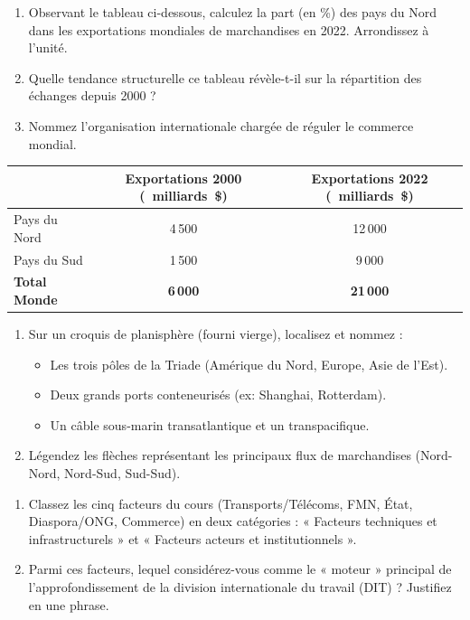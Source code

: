 \documentclass[11pt]{article}
\begin{document}
\begin{exercice}
\begin{enumerate}
    \item Observant le tableau ci-dessous, calculez la part (en \%) des pays du Nord dans les exportations mondiales de marchandises en 2022. Arrondissez à l'unité.
    \item Quelle tendance structurelle ce tableau révèle-t-il sur la répartition des échanges depuis 2000 ?
    \item Nommez l'organisation internationale chargée de réguler le commerce mondial.
\end{enumerate}

\begin{tabular}{lcc}
\hline
 & \textbf{Exportations 2000 (\SI{}{milliards \$})} & \textbf{Exportations 2022 (\SI{}{milliards \$})} \\
\hline
Pays du Nord & 4\,500 & 12\,000 \\
Pays du Sud & 1\,500 & 9\,000 \\
\hline
\textbf{Total Monde} & \textbf{6\,000} & \textbf{21\,000} \\
\hline
\end{tabular}
\end{exercice}

\begin{exercice}
\begin{enumerate}
    \item Sur un croquis de planisphère (fourni vierge), localisez et nommez : 
    \begin{itemize}
        \item Les trois pôles de la Triade (Amérique du Nord, Europe, Asie de l'Est).
        \item Deux grands ports conteneurisés (ex: Shanghai, Rotterdam).
        \item Un câble sous-marin transatlantique et un transpacifique.
    \end{itemize}
    \item Légendez les flèches représentant les principaux flux de marchandises (Nord-Nord, Nord-Sud, Sud-Sud).
\end{enumerate}
\end{exercice}

\begin{exercice}
\begin{enumerate}
    \item Classez les cinq facteurs du cours (Transports/Télécoms, FMN, État, Diaspora/ONG, Commerce) en deux catégories : « Facteurs techniques et infrastructurels » et « Facteurs acteurs et institutionnels ».
    \item Parmi ces facteurs, lequel considérez-vous comme le « moteur » principal de l'approfondissement de la division internationale du travail (DIT) ? Justifiez en une phrase.
\end{enumerate}
\end{exercice}
\end{document}
